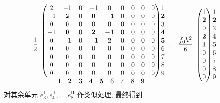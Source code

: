 \[\frac12\begin{array}{c@{}c}
\begin{pmatrix}
2&-1&0&-1&0&0&0&0&0\\
-1&\mathbf2&0&\mathbf0&\mathbf{-1}&0&0&0&0\\
0&0&0&0&0&0&0&0&0\\
-1&\mathbf0&0&\mathbf2&\mathbf{-1}&0&0&0&0\\
0&\mathbf{-1}&0&\mathbf{-1}&\mathbf2&0&0&0&0\\
0&0&0&0&0&0&0&0&0\\0&0&0&0&0&0&0&0&0\\0&0&0&0&0&0&0&0&0\\0&0&0&0&0&0&0&0&0
\end{pmatrix}&\begin{matrix}1\\\mathbf2\\3\\\mathbf4\\\mathbf5\\6\\7\\8\\9\end{matrix}\\
\begin{matrix}1&\mathbf2&3&\mathbf4&\mathbf5&6&7&8&9\end{matrix}&
\end{array},\quad\frac{f_0h^2}{6}\begin{array}{c@{}c}
\begin{pmatrix}1\\\mathbf2\\0\\\mathbf2\\\mathbf1\\0\\0\\0\\0\end{pmatrix}&\begin{matrix}1\\\mathbf2\\3\\\mathbf4\\\mathbf5\\6\\7\\8\\9\end{matrix}
\end{array}\]
{对其余单元 $e_3^{\mathrm I},e_4^{\mathrm {II}},\ldots,e_8^{\mathrm {II}}$ 作类似处理, 最终得到}
